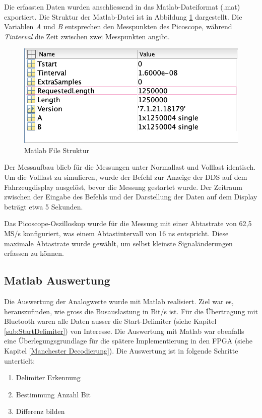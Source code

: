 Die erfassten Daten wurden anschliessend in das Matlab-Dateiformat (.mat) exportiert. Die Struktur der Matlab-Datei ist in Abbildung \ref{fig:MatlabFileStruktur} dargestellt. Die Variablen \textit{A} und \textit{B} entsprechen den Messpunkten des Picoscope, während \textit{Tinterval} die Zeit zwischen zwei Messpunkten angibt. 

\begin{figure}[H]
    \centering
    \includegraphics[width=0.5\linewidth]{Figures/Chap3/Busauslastung/Matlab_file_struktur.png}
    \caption{Matlab File Struktur}
    \label{fig:MatlabFileStruktur}
\end{figure}

Der Messaufbau blieb für die Messungen unter Normallast und Volllast identisch. Um die Volllast zu simulieren, wurde der Befehl zur Anzeige der DDS auf dem Fahrzeugdisplay ausgelöst, bevor die Messung gestartet wurde. Der Zeitraum zwischen der Eingabe des Befehls und der Darstellung der Daten auf dem Display beträgt etwa 5 Sekunden.

Das Picoscope-Oszilloskop wurde für die Messung mit einer Abtastrate von 62,5 MS/s konfiguriert, was einem Abtastintervall von 16 ns entspricht. Diese maximale Abtastrate wurde gewählt, um selbst kleinste Signaländerungen erfassen zu können. 

\subsection{Matlab Auswertung}
Die Auswertung der Analogwerte wurde mit Matlab realisiert. Ziel war es, herauszufinden, wie gross die Busauslastung in Bit/s ist. Für die Übertragung mit Bluetooth waren alle Daten ausser die Start-Delimiter (siehe Kapitel \ref{sub:StartDelimiter}) von Interesse. Die Auswertung mit Matlab war ebenfalls eine Überlegungsgrundlage für die spätere Implementierung in den FPGA (siehe Kapitel \ref{Manchester Decodierung}). Die Auswertung ist in folgende Schritte untertielt:
\begin{enumerate}
    \item Delimiter Erkennung
    \item Bestimmung Anzahl Bit
    \item Differenz bilden
\end{enumerate}


